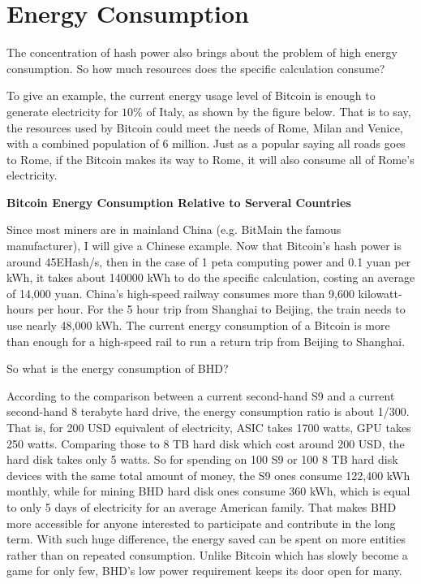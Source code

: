 \section{Energy Consumption}
\begin{flushleft}
    The concentration of hash power also brings about the problem of high energy consumption. So how much resources does the specific calculation consume?
\end{flushleft}
\begin{flushleft}
    To give an example, the current energy usage level of Bitcoin is enough to generate electricity for $10\%$ of Italy, as shown by the figure below. That is to say, the resources used by Bitcoin could meet the needs of Rome, Milan and Venice, with a combined population of 6 million. Just as a popular saying all roads goes to Rome, if the Bitcoin makes its way to Rome, it will also consume all of Rome's electricity.
\end{flushleft}
\begin{flushleft}
    \centering\textbf{Bitcoin Energy Consumption Relative to Serveral Countries}
\end{flushleft}

\begin{flushleft}
    Since most miners are in mainland China (e.g. BitMain the famous manufacturer), I will give a Chinese example. Now that Bitcoin's hash power is around 45EHash/s, then in the case of 1 peta computing power and 0.1 yuan per kWh, it takes about 140000 kWh to do the specific calculation, costing an average of 14,000 yuan. China's high-speed railway consumes more than 9,600 kilowatt-hours per hour. For the 5 hour trip from Shanghai to Beijing, the train needs to use nearly 48,000 kWh. The current energy consumption of a Bitcoin is more than enough for a high-speed rail to run a return trip from Beijing to Shanghai.
\end{flushleft}
\begin{flushleft}
    So what is the energy consumption of BHD?
\end{flushleft}
\begin{flushleft}
    According to the comparison between a current second-hand S9 and a current second-hand 8 terabyte hard drive, the energy consumption ratio is about 1/300. That is, for 200 USD equivalent of electricity, ASIC takes 1700 watts, GPU takes 250 watts. Comparing those to 8 TB hard disk which cost around 200 USD, the hard disk takes only 5 watts. So for spending on 100 S9 or 100 8 TB hard disk devices with the same total amount of money, the S9 ones consume 122,400 kWh monthly, while for mining BHD hard disk ones consume 360 kWh, which is equal to only 5 days of electricity for an average American family. That makes BHD more accessible for anyone interested to participate and contribute in the long term. With such huge difference, the energy saved can be spent on more entities rather than on repeated consumption. Unlike Bitcoin which has slowly become a game for only few, BHD’s low power requirement keeps its door open for many.
\end{flushleft}
